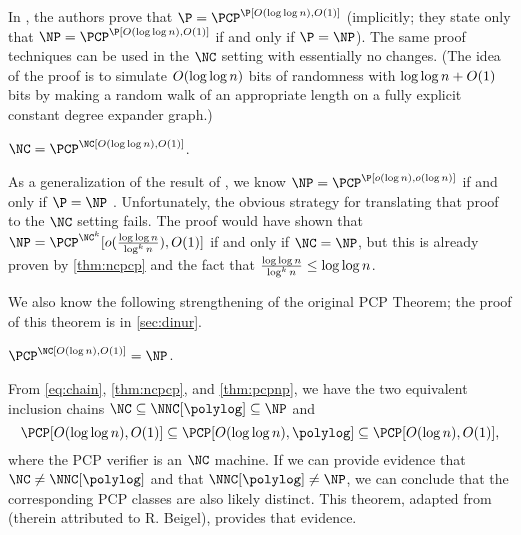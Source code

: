 In \autocite{fs96}, the authors prove that $\P = \PCP^\P[O(\loglog n), O(1)]$ (implicitly; they state only that $\NP = \PCP^\P[O(\loglog n), O(1)]$ if and only if $\P = \NP$).
The same proof techniques can be used in the $\NC$ setting with essentially no changes.
(The idea of the proof is to simulate $O(\log\log n)$ bits of randomness with $\log\log n + O(1)$ bits by making a random walk of an appropriate length on a fully explicit constant degree expander graph.)

\begin{theorem}\label{thm:ncpcp}
  $\NC = \PCP^\NC[O(\loglog n), O(1)]$.
\end{theorem}

As a generalization of the result of \autocite{fs96}, we know $\NP = \PCP^\P[o(\log n), o(\log n)]$ if and only if $\P = \NP$ \autocites{as98}{fglss91}.
Unfortunately, the obvious strategy for translating that proof to the $\NC$ setting fails.
The proof would have shown that $\NP = \PCP^{\NC^k}[o(\frac{\loglog n}{\log^k n}), O(1)]$ if and only if $\NC = \NP$, but this is already proven by \autoref{thm:ncpcp} and the fact that $\frac{\log\log n}{\log^k n} \leq \log\log n$.

We also know the following strengthening of the original PCP Theorem; the proof of this theorem is in \autoref{sec:dinur}.
\begin{theorem}\label{thm:pcpnp}
  $\PCP^\NC[O(\log n), O(1)] = \NP$.
\end{theorem}

From \autoref{eq:chain}, \autoref{thm:ncpcp}, and \autoref{thm:pcpnp}, we have the two equivalent inclusion chains
$
  \NC \subseteq \NNC[\polylog] \subseteq \NP
$
and
\begin{equation*}
  \PCP[O(\loglog n), O(1)] \subseteq \PCP[O(\loglog n), \polylog] \subseteq \PCP[O(\log n), O(1)],
\end{equation*}
where the PCP verifier is an $\NC$ machine.
If we can provide evidence that $\NC \neq \NNC[\polylog]$ and that $\NNC[\polylog] \neq \NP$, we can conclude that the corresponding PCP classes are also likely distinct.
This theorem, adapted from \autocite[Theorem~1]{dt90} (therein attributed to R. Beigel), provides that evidence.

